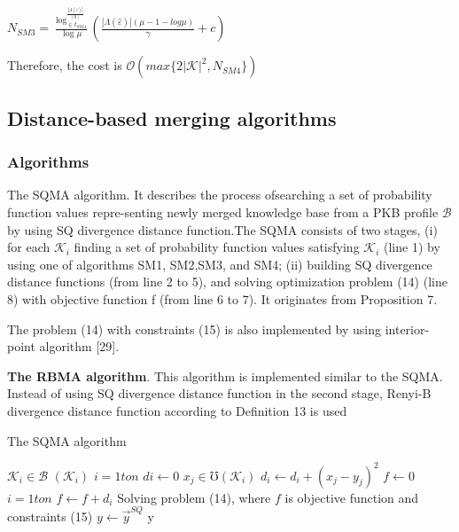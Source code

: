 \documentclass[10pt,a4paper]{IOS-Book-Article}
\begin{document}
$N_{SM3} = \frac{\log^{\frac{|\Lambda(\hat{\varepsilon})|}{(0)}}_{\in t_{SM4}}}{\log\mu} \left( \frac{ |\Lambda(\hat{\varepsilon})| (\mu − 1 − log\mu)}{\gamma} + c\right)$

Therefore, the cost is $\mathcal{O}(max\{2 |\mathcal{K}|^2 ,N_{SM4}\})$

\subsection{Distance-based merging algorithms}

\subsubsection{Algorithms}

The SQMA algorithm. It describes the process ofsearching a set of probability function values repre-senting newly merged knowledge base from a PKB 
profile $\mathcal{B}$ by using SQ divergence distance function.The SQMA consists of two stages, (i) for each $\mathcal{K}_i$
finding a set of probability function values satisfying $\mathcal{K}_i$ (line 1) by using one of algorithms SM1, SM2,SM3, and SM4; (ii) building SQ divergence distance
functions (from line 2 to 5), and solving optimization problem (14) (line 8) with objective function f (from line 6 to 7). It originates from Proposition 7.

The problem (14) with constraints (15) is also
implemented by using interior-point algorithm [29].

\textbf{The RBMA algorithm}. This algorithm is implemented
similar to the SQMA. Instead of using SQ
divergence distance function in the second stage,
Renyi-B divergence distance function according to
Definition 13 is used

\begin{algorithm}
\caption{The SQMA algorithm}
\begin{algorithmic}[1]
\For $\mathcal{K}_i \in \mathcal{B}$
  \State $(\mathcal{K}_i )$
\EndFor
\For $i=1 to n$
  \State $di \gets 0$
  \For $x_j \in \mho(\mathcal{K}_i)$
    \State $d_i \gets d_i + (x_j − y_j)^2$
  \EndFor
\EndFor
\State $f \gets 0$
\For $i=1 to n$
  \State $f \gets f + d_i$
\EndFor
\State Solving problem (14), where $f$ is objective function and
constraints (15)
\State $y \gets \vec{y}^{SQ}$
\State \Return y
\end{algorithmic}
\end{algorithm}
\end{document}
